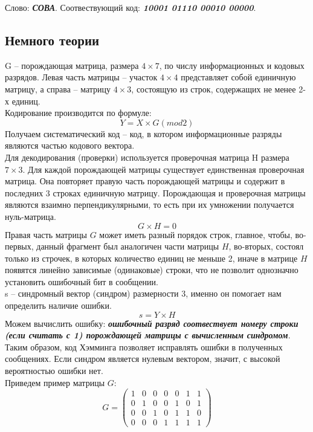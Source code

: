 \documentclass[a5paper, 10pt]{article}
\theoremstyle{definition}
\theoremstyle{plain}
\theoremstyle{remark}
\begin{document}
Слово: \textbf{\textit{СОВА}}.
Соотвествующий код: \textbf{\textit{10001 01110 00010 00000}}.

\subsection{Немного теории}
G -- порождающая матрица, размера $4 \times 7$, по числу информационных и кодовых разрядов. Левая часть матрицы -- участок  $4 \times 4$ представляет собой единичную матрицу, а справа -- матрицу $4 \times 3$, состоящую из строк, содержащих не менее 2-х единиц.\\

Кодирование производится по формуле:
\begin{equation}
Y = X \times G  (mod 2)
\end{equation}
Получаем систематический код -- код, в котором информационные разряды являются частью кодового вектора.\\

Для декодирования (проверки) используется проверочная матрица H размера $7 \times 3$. Для каждой порождающей матрицы существует единственная проверочная матрица. Она повторяет правую часть порождающей матрицы и содержит в последних 3 строках единичную матрицу. Порождающая и проверочная матрицы являются взаимно перпендикулярными, то есть при их умножении получается нуль-матрица.
\begin{equation}
G \times H  = 0
\end{equation}
Правая часть матрицы $G$ может иметь разный порядок строк, главное, чтобы, во-первых, данный фрагмент был аналогичен части матрицы $H$, во-вторых, состоял только из строчек, в которых количество единиц не меньше 2, иначе в матрице $H$ появятся линейно зависимые (одинаковые) строки, что не позволит однозначно установить ошибочный бит в сообщении.\\
s -- синдромный вектор (синдром) размерности 3, именно он помогает нам определить наличие ошибки.
\begin{equation}
s = Y \times H
\end{equation}
Можем вычислить ошибку:  \textbf{\textit{ошибочный разряд соотвествует номеру строки (если считать с 1) порождающей матрицы с вычисленным синдромом}}. Таким образом, код Хэмминга позволяет исправлять ошибки в полученных сообщениях. Если синдром является нулевым вектором, значит, с высокой вероятностью ошибки нет.\\
Приведем пример матрицы $G$:
\begin{equation}
G = 
\begin{pmatrix}
1 & 0 & 0 & 0 & 0 & 1 & 1\\
0 & 1 & 0 & 0 & 1 & 0 & 1\\
0 & 0 & 1 & 0 & 1 & 1 & 0\\
0 & 0 & 0 & 1 & 1 & 1 & 1
\end{pmatrix}
\end{equation}
\end{document}
